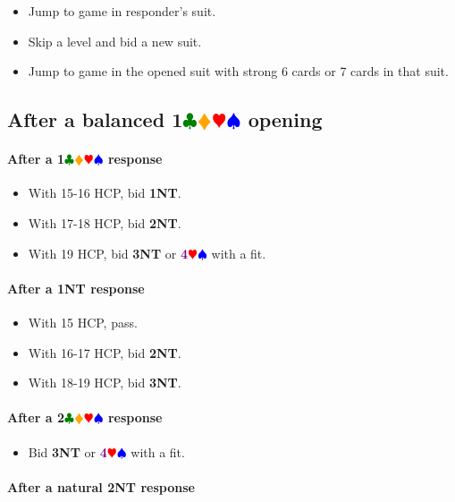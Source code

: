 \documentclass{article}
\newcommand{\Hs}{\textcolor{Red}{$\varheart$}}
\newcommand{\Ss}{\textcolor{Blue}{$\spadesuit$}}
\newcommand{\Ds}{\textcolor{Orange}{$\vardiamond$}}
\newcommand{\Cs}{\textcolor{Green}{$\clubsuit$}}
\newcommand{\NTs}{\textbf{\footnotesize{NT}}}
\newcommand{\NT}[1]{\textbf{#1\NTs}}
\newcommand{\suits}[1]{\textbf{#1}\Cs\Ds\Hs\Ss}
\newcommand{\majors}[1]{\textcolor{Purple}{\textbf{#1}}\Hs\Ss}
\begin{document}
\begin{itemize}
\item Jump to game in responder's suit.
\item Skip a level and bid a new suit.
\item Jump to game in the opened suit with strong 6 cards or 7 cards in that suit.
\end{itemize}

\subsection{After a balanced \suits{1} opening}


\paragraph{After a \suits{1} response}

\begin{itemize}
\item With 15-16 HCP, bid \NT{1}.
\item With 17-18 HCP, bid \NT{2}.
\item With 19 HCP, bid \NT{3} or \majors{4} with a fit.
\end{itemize}

\paragraph{After a \NT{1} response}

\begin{itemize}
\item With 15 HCP, pass.
\item With 16-17 HCP, bid \NT{2}.
\item With 18-19 HCP, bid \NT{3}.
\end{itemize}

\paragraph{After a \suits{2} response}

\begin{itemize}
\item Bid \NT{3} or \majors{4} with a fit.
\end{itemize}

\paragraph{After a natural \NT{2} response}
\end{document}
